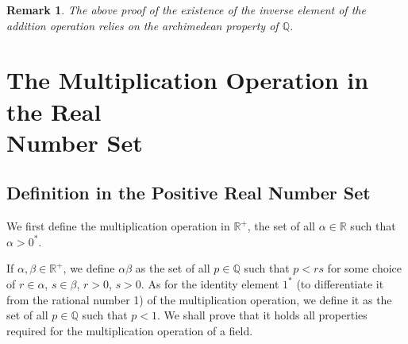 \documentclass[onecolumn]{article}
\newtheorem{remark}{Remark}
\begin{document}
\begin{remark}
  The above proof of the existence of the inverse element of the addition 
  operation relies on the archimedean property of $\mathbb{Q}$.
\end{remark}

\section{The Multiplication Operation in the Real \\ Number Set}

\subsection{Definition in the Positive Real Number Set}

We first define the multiplication operation in $\mathbb{R^+}$, the set of all 
$\alpha \in \mathbb{R}$ such that $\alpha > 0^*$.

If $\alpha, \beta \in \mathbb{R^+}$, we define $\alpha \beta$ as the set of 
all $p \in \mathbb{Q}$ such that $p < rs$ for some choice of $r \in \alpha$, 
$s \in \beta$, $r > 0$, $s > 0$. As for the identity element $1^*$ (to 
differentiate it from the rational number 1) of the multiplication operation, we 
define it as the set of all $p \in \mathbb{Q}$ such that $p < 1$. We shall prove 
that it holds all properties required for the multiplication operation of a 
field.
\end{document}
